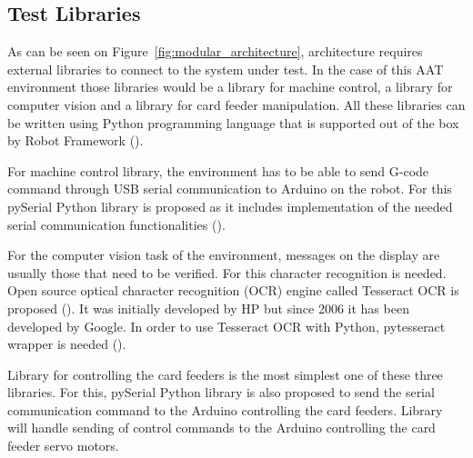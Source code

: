 \FloatBarrier
\subsection{Test Libraries}
\label{subsection:test libraries}

As can be seen on Figure~\ref{fig:modular_architecture}, architecture requires external libraries to connect to the system under test. In the case of this AAT environment those libraries would be a library for machine control, a library for computer vision and a library for card feeder manipulation. All these libraries can be written using Python programming language that is supported out of the box by Robot Framework (\emph{\cite{robotframework}}).

For machine control library, the environment has to be able to send G-code command through USB serial communication to Arduino on the robot. For this pySerial Python library is proposed as it includes implementation of the needed serial communication functionalities (\emph{\cite{pyserial}}).

For the computer vision task of the environment, messages on the display are usually those that need to be verified. For this character recognition is needed. Open source optical character recognition (OCR) engine called Tesseract OCR is proposed (\emph{\cite{tesseract}}). It was initially developed by HP but since 2006 it has been developed by Google. In order to use Tesseract OCR with Python, pytesseract wrapper is needed (\emph{\cite{pytesseract}}).

Library for controlling the card feeders is the most simplest one of these three libraries. For this, pySerial Python library is also proposed to send the serial communication command to the Arduino controlling the card feeders. Library will handle sending of control commands to the Arduino controlling the card feeder servo motors.